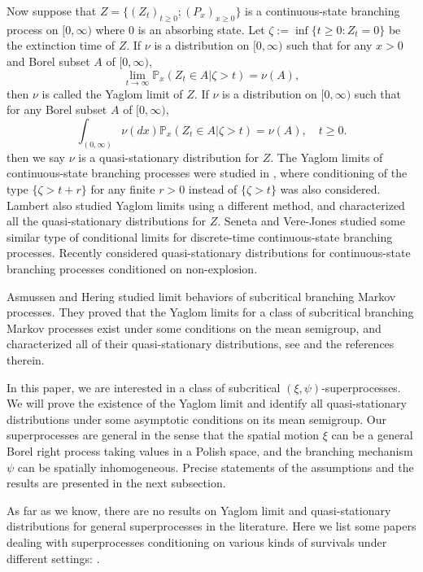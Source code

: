 \documentclass[12pt,a4paper]{amsart}
\numberwithin{equation}{section}
\theoremstyle{plain}
\theoremstyle{definition}
\theoremstyle{remark}
\begin{document}
	Now suppose that $Z =\{(Z_t)_{t \geq 0}; (P_x)_{x\geq 0}\}$  is a  continuous-state branching process on $[0,\infty)$ where $0$ is an absorbing state.  Let $\zeta:=\inf\{t\geq 0: Z_t=0\}$ be the extinction time of $Z$.
	If $\nu$ is a distribution on $[0,\infty)$ such that for any $x>0$ and Borel subset $A$ of $[0,\infty)$,
\[
	\lim_{t\rightarrow\infty}\mathbb P_x(Z_t\in A\big|\zeta>t)=\nu(A),
\]
then $\nu$ is called the Yaglom limit of $Z$.
	If $\nu$ is a distribution on $[0,\infty)$ such that for any Borel subset $A$ of $[0,\infty)$,
\[
	\int_{(0,\infty)} \nu(dx)\mathbb P_x (Z_t \in A | \zeta > t) = \nu (A), \quad t\geq 0.
\]
	then we say $\nu$ is a quasi-stationary distribution for $Z$.
	The Yaglom limits of continuous-state branching processes were studied in \cite{Li00}, where conditioning of the type $\{\zeta>t+r\}$ for any finite $r>0$ instead of $\{\zeta>t\}$ was also considered.
	Lambert \cite{Lambert2007Quasi-stationary} also studied Yaglom limits using a different method, and characterized all the quasi-stationary distributions  for $Z$.
	Seneta and Vere-Jones \cite{SenetaVere-Jones1968On} studied some similar type of conditional limits for discrete-time continuous-state branching processes.
	Recently \cite{Labbe2013Quasi-stationary}
considered quasi-stationary distributions
for continuous-state branching processes conditioned on non-explosion.


Asmussen and Hering \cite{AH} studied limit 
behaviors of subcritical branching Markov processes. 
They proved that the Yaglom limits for a class of subcritical  branching Markov processes exist under some conditions on the mean semigroup, and characterized all of their quasi-stationary distributions,
see \cite[Chapter 5]{AH} and the references therein.


In this paper, we are interested in a class of
subcritical $(\xi, \psi)$-superprocesses.
	We will prove the existence of the Yaglom limit and identify all  quasi-stationary distributions
under some asymptotic conditions on its mean semigroup.
	Our superprocesses are general in the sense that the spatial motion $\xi$ can be a general
Borel right process taking values in a Polish space,
	and the branching mechanism $\psi$ can be spatially inhomogeneous.
	Precise statements of the assumptions and the results are presented in the next subsection.
	
As far as we know, there are no results on
	Yaglom limit and quasi-stationary distributions for general superprocesses in the  literature.
	Here we list some papers dealing with superprocesses conditioning on various kinds of survivals under different settings:
	\cite{ChampagnatRaelly2008Limit, Etheridge2003A-decomposition, Evans1992The-entrance, EvansPerkins1990Measure-valued, LiuRen2009Some, RenSongSun2019Spine, RenSongSun2018Limit, RenSongZhang2015Limit, Serlet1996Occupation}.
\end{document}

